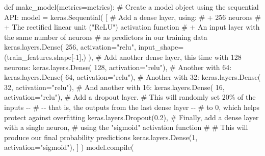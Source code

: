 \documentclass[
  letterpaper,
  DIV=11,
  numbers=noendperiod]{scrartcl}
\newenvironment{Shaded}{\begin{snugshade}}{\end{snugshade}}
\newcommand{\BuiltInTok}[1]{\textcolor[rgb]{0.00,0.23,0.31}{#1}}
\newcommand{\CommentTok}[1]{\textcolor[rgb]{0.37,0.37,0.37}{#1}}
\newcommand{\DecValTok}[1]{\textcolor[rgb]{0.68,0.00,0.00}{#1}}
\newcommand{\FloatTok}[1]{\textcolor[rgb]{0.68,0.00,0.00}{#1}}
\newcommand{\KeywordTok}[1]{\textcolor[rgb]{0.00,0.23,0.31}{#1}}
\newcommand{\NormalTok}[1]{\textcolor[rgb]{0.00,0.23,0.31}{#1}}
\newcommand{\OperatorTok}[1]{\textcolor[rgb]{0.37,0.37,0.37}{#1}}
\newcommand{\StringTok}[1]{\textcolor[rgb]{0.13,0.47,0.30}{#1}}
\begin{document}
\begin{Shaded}
\begin{Highlighting}[]
\KeywordTok{def}\NormalTok{ make\_model(metrics}\OperatorTok{=}\NormalTok{metrics):}
    \CommentTok{\# Create a model object using the sequential API:}
\NormalTok{    model }\OperatorTok{=}\NormalTok{ keras.Sequential(}
\NormalTok{        [}
            \CommentTok{\# Add a dense layer, using:}
            \CommentTok{\# + 256 neurons}
            \CommentTok{\# + The rectified linear unit ("ReLU") activation function}
            \CommentTok{\# + An input layer with the same number of neurons}
            \CommentTok{\#   as predictors in our training data}
\NormalTok{            keras.layers.Dense(}
                \DecValTok{256}\NormalTok{, activation}\OperatorTok{=}\StringTok{"relu"}\NormalTok{, input\_shape}\OperatorTok{=}\NormalTok{(train\_features.shape[}\OperatorTok{{-}}\DecValTok{1}\NormalTok{],)}
\NormalTok{            ),}
            \CommentTok{\# Add another dense layer, this time with 128 neurons:}
\NormalTok{            keras.layers.Dense(}
                \DecValTok{128}\NormalTok{, activation}\OperatorTok{=}\StringTok{"relu"}\NormalTok{),}
            \CommentTok{\# Another with 64:}
\NormalTok{            keras.layers.Dense(}
                \DecValTok{64}\NormalTok{, activation}\OperatorTok{=}\StringTok{"relu"}\NormalTok{),}
            \CommentTok{\# Another with 32:}
\NormalTok{            keras.layers.Dense(}
                \DecValTok{32}\NormalTok{, activation}\OperatorTok{=}\StringTok{"relu"}\NormalTok{),}
            \CommentTok{\# And another with 16:}
\NormalTok{            keras.layers.Dense(}
                \DecValTok{16}\NormalTok{, activation}\OperatorTok{=}\StringTok{"relu"}\NormalTok{),}
            \CommentTok{\# Add a dropout layer.}
            \CommentTok{\# This will randomly set 20\% of the inputs {-}{-} }
            \CommentTok{\# {-}{-} that is, the outputs from the last dense layer {-}{-}}
            \CommentTok{\# to 0, which helps protect against overfitting}
\NormalTok{            keras.layers.Dropout(}\FloatTok{0.2}\NormalTok{),}
            \CommentTok{\# Finally, add a dense layer with a single neuron,}
            \CommentTok{\# using the "sigmoid" activation function}
            \CommentTok{\# }
            \CommentTok{\# This will produce our final probability predictions}
\NormalTok{            keras.layers.Dense(}\DecValTok{1}\NormalTok{, activation}\OperatorTok{=}\StringTok{"sigmoid"}\NormalTok{),}
\NormalTok{        ]}
\NormalTok{    )}
\NormalTok{    model.}\BuiltInTok{compile}\NormalTok{(}

\end{Highlighting}
\end{Shaded}
\end{document}
